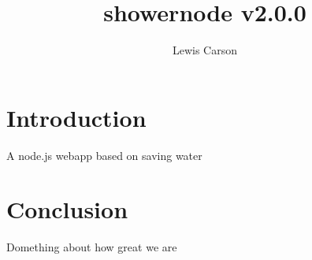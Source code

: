 \documentclass{article}
\begin{document}
\title{showernode v2.0.0}
\author{Lewis Carson}

\maketitle

\section{Introduction}
A node.js webapp based on saving water

\section{Conclusion}
Domething about how great we are
\end{document}
